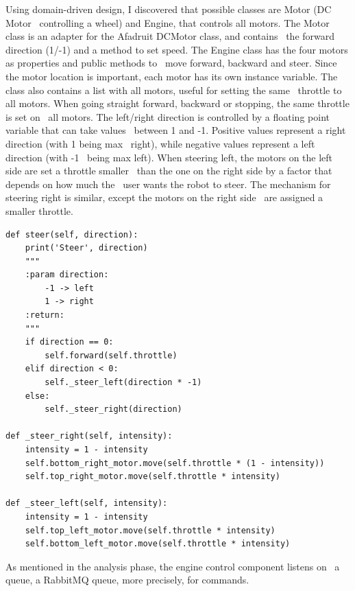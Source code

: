 Using domain-driven design, I discovered that possible classes are Motor (DC Motor \
controlling a wheel) and Engine, that controls all motors.
The Motor class is an adapter for the Afadruit DCMotor class, and contains \
the forward direction (1/-1) and a method to set speed.
The Engine class has the four motors as properties and public methods to \
move forward, backward and steer.
Since the motor location is important, each motor has its own instance variable.
The class also contains a list with all motors, useful for setting the same \
throttle to all motors.
When going straight forward, backward or stopping, the same throttle is set on \
all motors.
The left/right direction is controlled by a floating point variable that can take values \
between 1 and -1.
Positive values represent a right direction (with 1 being max \
right), while negative values represent a left direction (with -1 \
being max left).
When steering left, the motors on the left side are set a throttle smaller \
than the one on the right side by a factor that depends on how much the \
user wants the robot to steer.
The mechanism for steering right is similar, except the motors on the right side \
are assigned a smaller throttle.
\begin{verbatim}
def steer(self, direction):
    print('Steer', direction)
    """
    :param direction:
        -1 -> left
        1 -> right
    :return:
    """
    if direction == 0:
        self.forward(self.throttle)
    elif direction < 0:
        self._steer_left(direction * -1)
    else:
        self._steer_right(direction)

def _steer_right(self, intensity):
    intensity = 1 - intensity
    self.bottom_right_motor.move(self.throttle * (1 - intensity))
    self.top_right_motor.move(self.throttle * intensity)

def _steer_left(self, intensity):
    intensity = 1 - intensity
    self.top_left_motor.move(self.throttle * intensity)
    self.bottom_left_motor.move(self.throttle * intensity)

\end{verbatim}
As mentioned in the analysis phase, the engine control component listens on \
a queue, a RabbitMQ queue, more precisely, for commands.

